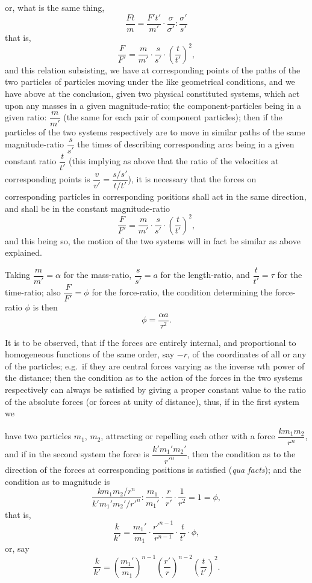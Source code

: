 \documentclass[11pt,a4paper]{article}
\theoremstyle{plain}
\theoremstyle{definition}
\begin{document}
\clearpage

\noindent
or, what is the same thing,
\[
\frac{Ft}{m} = \frac{F't'}{m'} \cdot \frac{\sigma}{\sigma'} : \frac{\sigma'}{s'}
\]
that is,
\[
\frac{F}{F'} = \frac{m}{m'}\cdot\frac{s}{s'}\cdot\left(\frac{t}{t'}\right)^2,
\]
and this relation subsisting, we have at corresponding points of the paths of the two
particles of particles moving under the like geometrical conditions, and we have above
at the conclusion, given two physical constituted systems, which act upon any masses
in a given magnitude-ratio; the component-particles being in a given ratio: $\dfrac{m}{m'}$
(the same for each pair of component particles); then if the particles of the two
systems respectively are to move in similar paths of the same magnitude-ratio $\dfrac{s}{s'}$ the
times of describing corresponding arcs being in a given constant ratio $\dfrac{t}{t'}$ (this implying
as above that the ratio of the velocities at corresponding points is $\dfrac{v}{v'} = \dfrac{s/s'}{t/t'}$), it is
necessary that the forces on corresponding particles in corresponding positions shall act
in the same direction, and shall be in the constant magnitude-ratio
\[
\frac{F}{F'} = \frac{m}{m'}\cdot\frac{s}{s'}\cdot\left(\frac{t}{t'}\right)^2,
\]
and this being so, the motion of the two systems will in fact be similar as above
explained.

Taking $\dfrac{m}{m'} = \alpha$ for the mass-ratio, $\dfrac{s}{s'} = a$ for the length-ratio, and $\dfrac{t}{t'} = \tau$ for the time-ratio; also $\dfrac{F}{F'} = \phi$ for the force-ratio, the condition determining the force-ratio $\phi$
is then
\[
\phi = \frac{\alpha a}{\tau^2}.
\]

It is to be observed, that if the forces are entirely internal, and proportional to
homogeneous functions of the same order, say $-r$, of the coordinates of all or any of
the particles; e.g.\ if they are central forces varying as the inverse $n$th power of the
distance; then the condition as to the action of the forces in the two systems
respectively can always be satisfied by giving a proper constant value to the ratio of
the absolute forces (or forces at unity of distance), thus, if in the first system we

\clearpage

\noindent
have two particles $m_1$, $m_2$, attracting or repelling each other with a force $\dfrac{km_1m_2}{r^n}$, and
if in the second system the force is $\dfrac{k'm_1' m_2'}{r'^n}$, then the condition as to the direction
of the forces at corresponding positions is satisfied (\textit{qua facts}); and the condition as to
magnitude is
\[
\frac{km_1 m_2 / r^n}{k'm_1' m_2'/r'^n} : \frac{m_1}{m_1'} \cdot \frac{r}{r'} \cdot \frac{1}{r^2} = 1 = \phi,
\]
that is,
\[
\frac{k}{k'} = \frac{m_1'}{m_1} \cdot \frac{r'^{n-1}}{r^{n-1}} \cdot \frac{t}{t'} \cdot \phi,
\]
or, say
\[
\frac{k}{k'} = \left(\frac{m_1'}{m_1}\right)^{n-1}\left(\frac{r'}{r}\right)^{n-2}\left(\frac{t}{t'}\right)^2.
\]
\end{document}
